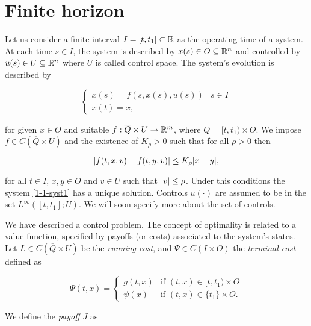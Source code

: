 \section{Finite horizon}


Let us consider a finite interval $I=[t,t_1]\subset\mathbb{R}$ as the operating time of a system. At each time $s\in I$, the system is described by $x(s)\in O\subseteq \mathbb{R}^n$ and controlled by $u(s)\in U\subseteq\mathbb{R}^n$
where $U$ is called control space. The system's evolution is described by

\begin{equation}\label{1-1-syst1}
    \begin{cases}
        \dot{x}(s) = f(s,x(s),u(s)) & s\in I \\
        x(t) = x,
    \end{cases}
\end{equation}

for given $x\in O$ and suitable $f:\overline{Q}\times U \rightarrow \mathbb{R}^m$, where $Q=[t,t_1)\times O$. We impose $f\in C(\overline{Q}\times U)$ and the existence of $K_{\rho}>0$ such that for all $\rho>0$ then

\begin{equation}\label{1-1-lipsch}
    \abs{f(t,x,v)-f(t,y,v)} \leq K_{\rho}\abs{x-y},
\end{equation}

for all $t\in I$, $x,y\in O$ and $v\in U$ such that $\abs{v}\leq\rho$. Under this conditions the system \eqref{1-1-syst1} has a unique solution. 
Controls $u(\cdot)$ are assumed to be in the set $L^{\infty}\left([t,t_1];U\right)$. We will soon specify more about the set of controls.

We have described a control problem. The concept of optimality is related to a value function, specified by payoffs (or costs) associated to the system's states.
Let $L\in C(\overline{Q}\times U)$ be the \textit{running cost}, and $\Psi\in C(I\times O)$ the \textit{terminal cost} defined as

\begin{equation}\label{1-1-deftermcost}
    \Psi(t,x) = \begin{cases}
        g(t,x) & \text{if } (t,x)\in [t,t_1)\times O \\
        \psi(x) & \text{if } (t,x)\in \{t_1\}\times O.  
    \end{cases}
\end{equation}

We define the \textit{payoff} $J$ as

